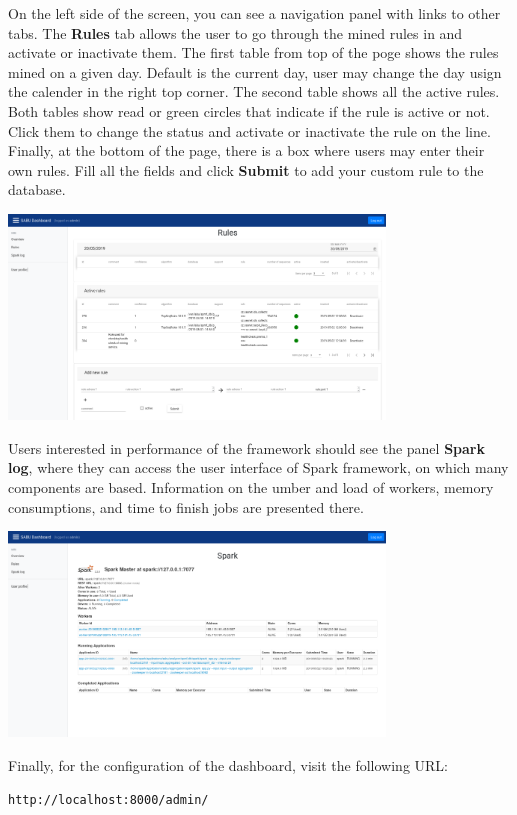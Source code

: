 \documentclass[a4paper]{article} %
\begin{document}
On the left side of the screen, you can see a navigation panel with links to other tabs. The \textbf{Rules} tab allows the user to go through the mined rules in and activate or inactivate them. The first table from top of the poge shows the rules mined on a given day. Default is the current day, user may change the day usign the calender in the right top corner. The second table shows all the active rules. Both tables show read or green circles that indicate if the rule is active or not. Click them to change the status and activate or inactivate the rule on the line. Finally, at the bottom of the page, there is a box where users may enter their own rules. Fill all the fields and click \textbf{Submit} to add your custom rule to the database.

\includegraphics[width=0.75\textwidth]{fig/dashboard_rules}

Users interested in performance of the framework should see the panel \textbf{Spark log}, where they can access the user interface of Spark framework, on which many components are based. Information on the umber and load of workers, memory consumptions, and time to finish jobs are presented there.

\includegraphics[width=0.75\textwidth]{fig/dashboard_spark}

Finally, for the configuration of the dashboard, visit the following URL:

\begin{lstlisting}[]
http://localhost:8000/admin/
\end{lstlisting}
\end{document}
